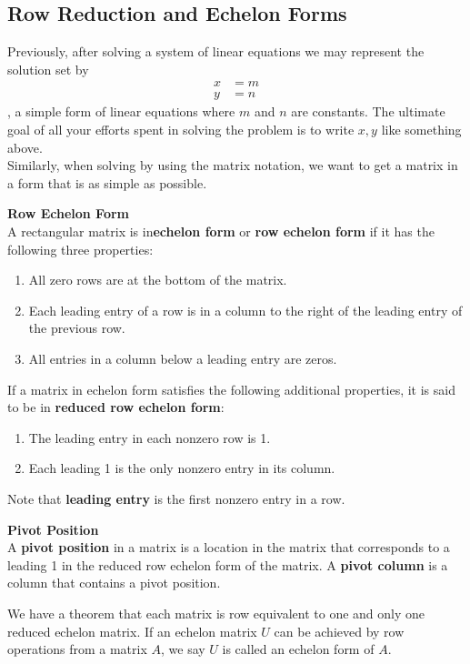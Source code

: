 \documentclass[10pt, a4paper]{article}
\begin{document}
\subsection{Row Reduction and Echelon Forms}
Previously, after solving a system of linear equations we may represent the solution set by 
\begin{align*}
x &= m\\
y &= n
\end{align*}
, a simple form of linear equations where $m$ and $n$ are constants. The ultimate goal of all your efforts spent in solving the problem is to write $x,y$ like something above.\\
\indent Similarly, when solving by using the matrix notation, we want to get a matrix in a form that is as simple as possible. 
\begin{definition}
    \textbf{Row Echelon Form}\\
    A rectangular matrix is in\textbf{echelon form} or \textbf{row echelon form} if it has the following three properties:
    \begin{enumerate}
        \item All zero rows are at the bottom of the matrix.
        \item Each leading entry of a row is in a column to the right of the leading entry of the previous row.
        \item All entries in a column below a leading entry are zeros.
    \end{enumerate}
    If a matrix in echelon form satisfies the following additional properties, it is said to be in \textbf{reduced row echelon form}:
    \begin{enumerate}
        \item The leading entry in each nonzero row is 1.
        \item Each leading 1 is the only nonzero entry in its column.
    \end{enumerate}
    Note that \textbf{leading entry} is the first nonzero entry in a row.
\end{definition}
\begin{definition}
    \textbf{Pivot Position}\\
    A \textbf{pivot position} in a matrix is a location in the matrix that corresponds to a leading 1 in the reduced row echelon form of the matrix.
    A \textbf{pivot column} is a column that contains a pivot position.
\end{definition}
\indent We have a theorem that each matrix is row equivalent to one and only one reduced echelon matrix. If an echelon matrix $U$ can be achieved by row operations from a matrix $A$, we say $U$ is called an echelon form of $A$.\\ 
\end{document}
